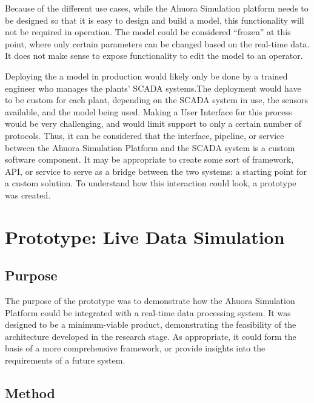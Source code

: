 \documentclass[12pt]{report}
\begin{document}
Because of the different use cases, while the Ahuora Simulation platform needs to be designed so that it is easy to design and build a model, this functionality will not be required in operation. The model could be considered ``frozen'' at this point, where only certain parameters can be changed based on the real-time data. It does not make sense to expose functionality to edit the model to an operator. 



Deploying the a model in production would likely only be done by a trained engineer who manages the plants' SCADA systems.The deployment would have to be custom for each plant, depending on the SCADA system in use, the sensors available, and the model being used. Making a User Interface for this process would be very challenging, and would limit support to only a certain number of protocols. Thus, it can be considered that the interface, pipeline, or service between the Ahuora Simulation Platform and the SCADA system is a custom software component. It may be appropriate to create some sort of framework, API, or service to serve as a bridge between the two systems: a starting point for a custom solution. To understand how this interaction could look, a prototype was created. 


\chapter{Prototype: Live Data Simulation}

\section{Purpose}

The purpose of the prototype was to demonstrate how the Ahuora Simulation Platform could be integrated with a real-time data processing system. It was designed to be a minimum-viable product, demonstrating the feasibility of the architecture developed in the research stage. As appropriate, it could form the basis of a more comprehensive framework, or provide insights into the requirements of a future system.

\section{Method}
\end{document}
